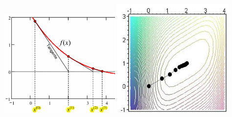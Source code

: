   \begin{minipage}{6cm}
  	\includegraphics[width=6cm]{./Content/NonLinearOptimization/newton1D}
    \includegraphics[width=6cm]{./Content/NonLinearOptimization/newton}
  \end{minipage}
  
  
